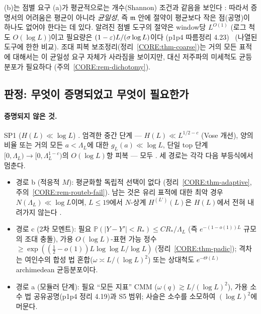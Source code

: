 \begin{remark}[장벽 III의 내용]\label{CORE:rem-fourier}
(b)는 점별 요구 (a)가 평균적으로는 개수(Shannon) 조건과 같음을 보인다 \PROVED: 따라서 증명서의 어려움은 평균이 아니라 \emph{균일성}, 즉 $\mathfrak m$ 안에 절약이 평균보다 작은 점(공명)이 하나도 없어야 한다는 데 있다. 알려진 점별 도구의 절약은 window당 $L^{O(1)}$ (로그 척도 $O(\log L)$)이고 필요량은 $(1-\varepsilon)L/(\sigma\log L)$이다 (p1p4 따름정리 4.23) \PROVED\ (나열된 도구에 한한 비교). 조대 피복 보조정리(정리~\ref{CORE:thm-coarse})는 거의 모든 표적에 대해서는 이 균일성 요구 자체가 사라짐을 보이지만, 대신 저주파의 미세척도 균등분포가 필요하다 (주의~\ref{CORE:rem-dichotomy}).
\end{remark}

\subsection{판정: 무엇이 증명되었고 무엇이 필요한가}
\label{CORE:ssec-verdict}

\paragraph{증명되지 않은 것.} SP1 ($H(L)\ll\log L$) \OPEN. 엄격한 중간 단계 --- $H(L)\ll L^{1/2-c}$ (Vose 개선), 양의 비율 또는 거의 모든 $a<\Lambda_L$에 대한 $g_L(a)\ll\log L$, 단일 top 단계 $[0,\Lambda_L)\to[0,\Lambda_L^{1-c})$의 $O(\log L)$항 피복 --- 모두 \OPEN. 세 경로는 각각 다음 부등식에서 멈춘다.
\begin{itemize}
\item 경로 b (적응적 $M$): 평균화할 독립적 선택이 없다 (정리~\ref{CORE:thm-adaptive}, 주의~\ref{CORE:rem-routeb-fail}). 남는 것은 유리 표적에 대한 최악 경우 $N(\Lambda_L)\ll\log L$이며, $L\le19$에서 $N$-상계 $H^{(L')}(L)$은 $H(L)$에서 전혀 내려가지 않는다 \NUMERIC.
\item 경로 c (2차 모멘트): 필요 $\mathbb P(|Y-Y'|<R_*)\le CR_*/\Lambda_L$ (즉 $e^{-(1-o(1))L}$ 규모의 조대 충돌), 가용 $O(\log L)$-표현 가능 정수 $\ge\exp((\frac12-o(1))L\log\log L/\log L)$ (정리~\ref{CORE:thm-padic}); 격차는 여인수의 합성 법 혼합($\omega\asymp L/(\log L)^2$) 또는 상대척도 $e^{-\Theta(L)}$ archimedean 균등분포이다.
\item 경로 a (모듈러 단계): 필요 ``모든 지표'' CMM ($\omega(q)\gtrsim L/(\log L)^2$), 가용 소수 법 공유공명(p1p4 정리 4.19)과 S5 범위; 사슬은 소수를 소모하여 $(\log L)^2$에 머문다.
\end{itemize}

